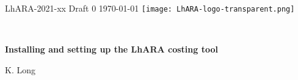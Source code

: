 \graphicspath{ {00-Top-matter/Figures/} }
\thispagestyle{empty}

\noindent LhARA-2021-xx Draft 0 \hfill \today{} \hfill  \texttt{[image: LhARA-logo-transparent.png]}

\vspace{-0.25cm}
\noindent{\color{DarkYellow} \rule[0mm]{\textwidth}{0.43pt}}\\
\vspace{-0.50cm}
\begin{center}
  {\bf\LARGE\color{DarkBlue}
    Installing and setting up the LhARA costing tool
  }
\end{center}
\vspace{-0.4cm}
\begin{center}
  K. Long
\end{center}
\vspace{-0.2cm}
